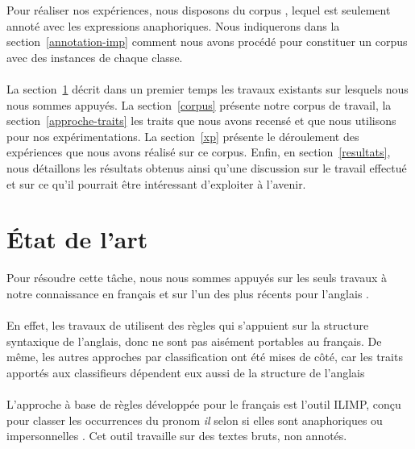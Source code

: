 \documentclass[a4paper,12pt]{article}
\begin{document}
Pour réaliser nos expériences, nous disposons du corpus \cite{tutin-hal-00373327}, lequel est seulement annoté avec les expressions anaphoriques. Nous indiquerons dans la section~\ref{annotation-imp} comment nous avons procédé pour constituer un corpus avec des instances de chaque classe.

\paragraph{}
La section~\ref{etat-art} décrit dans un premier temps les travaux existants sur lesquels nous nous sommes appuyés. La section~\ref{corpus} présente notre corpus de travail, la section~\ref{approche-traits} les traits que nous avons recensé et que nous utilisons pour nos expérimentations.
La section~\ref{xp} présente le déroulement des expériences que nous avons réalisé sur ce corpus.
Enfin, en section~\ref{resultats}, nous détaillons les résultats obtenus ainsi qu'une discussion sur le travail effectué et sur ce qu'il pourrait être intéressant d'exploiter à l'avenir.


\section{État de l'art}
\label{etat-art}

Pour résoudre cette tâche, nous nous sommes appuyés sur les seuls travaux à notre connaissance en français \citep{danlos-ilimp-taln2005} et sur l'un des plus récents pour l'anglais \citep{Bergsma-11}.

\paragraph{}
En effet, les travaux de \citet{Lappin-1994-APA-203987.203989} utilisent des règles qui s'appuient sur la structure syntaxique de l'anglais, donc ne sont pas aisément portables au français. De même, les autres approches par classification ont été mises de côté, car les traits apportés aux classifieurs dépendent eux aussi de la structure de l'anglais %

\paragraph{}
L'approche à base de règles développée pour le français est l'outil ILIMP, conçu pour classer les occurrences du pronom \og{}\textit{il}\fg{} selon si elles sont anaphoriques ou impersonnelles \citep{danlos-ilimp-taln2005}. Cet outil travaille sur des textes bruts, non annotés.
\end{document}
